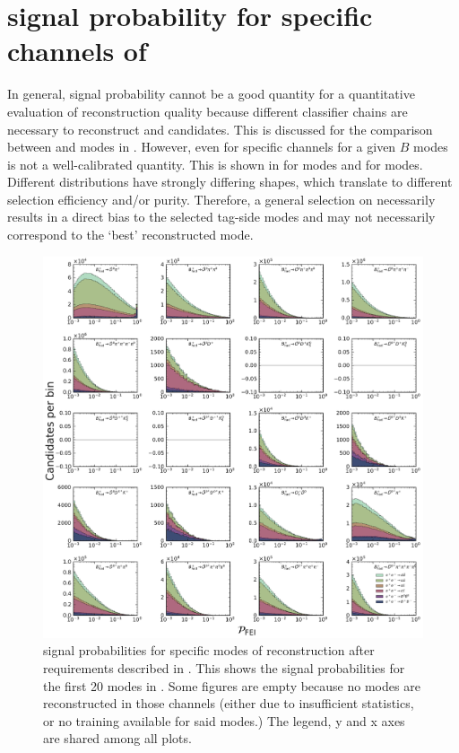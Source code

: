 \chapter{\texorpdfstring{\FEI}{FEI} signal probability for specific channels of \texorpdfstring{\B}{B}}\label{sec:appendix_fei_signal_probabilities}

In general, \FEI signal probability cannot be a good quantity for a quantitative evaluation of reconstruction quality because different classifier chains are necessary to reconstruct \Bp and \Bz candidates.
This is discussed for the comparison between \feiBp and \feiBz modes in .
However, even for specific channels for a given $B$ modes \feiProb is not a well-calibrated quantity.
This is shown in  for \Bp modes and  for \Bz modes.
Different distributions have strongly differing shapes, which translate to different selection efficiency and/or purity.
Therefore, a general selection on \feiProb necessarily results in a direct bias to the 
selected tag-side modes and may not necessarily correspond to the `best' reconstructed mode.

\begin{figure}[htbp!]

    \includegraphics[width=1\textwidth]{figures/appendices/FEI_signal_probabilities/Bp_feiSigProbs1.pdf}

    \caption{\label{fig:feisigprobs1} \FEI signal probabilities for specific modes of \Bp reconstruction after requirements described in .
    This shows the signal probabilities for the first 20 \Bp modes in .
    Some figures are empty because no modes are reconstructed in those channels (either due to insufficient statistics, or no training available for said modes.)
    The legend, y and x axes are shared among all plots.
    }
\end{figure}

